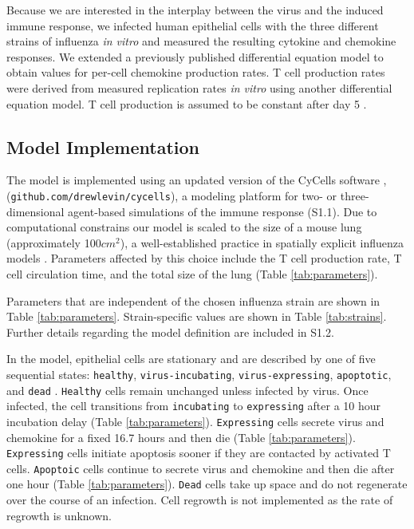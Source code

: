 \documentclass[preprint,10pt,authoryear]{elsarticle}
\begin{document}
Because we are interested in the interplay between the virus and the induced immune response, we infected human epithelial cells with the three different strains of influenza \textit{in vitro} and measured the resulting cytokine and chemokine responses.  We extended a previously published differential equation model \citep{Mitchell2011} to obtain values for per-cell chemokine production rates.  T cell production rates were derived from measured replication rates \textit{in vitro} \citep{Miao2010a} using another differential equation model. T cell production is assumed to be constant after day 5 \citep{MartIn-Fontecha2003}.  

\subsection*{Model Implementation}

The model is implemented using an updated version of the CyCells software \citep{Warrender2006},
(\texttt{github.com/drewlevin/cycells}),
a modeling platform for two- or three-dimensional agent-based simulations of the immune response (S1.1).  Due to computational constrains our model is scaled to the size of a mouse lung (approximately 100$cm^2$), a well-established practice in spatially explicit influenza models \citep{Miller2003, Allan2006, Ingulli2009}.  Parameters affected by this choice include the T cell production rate, T cell circulation time, and the total size of the lung (Table \ref{tab:parameters}).

Parameters that are independent of the chosen influenza strain are shown in Table \ref{tab:parameters}.  Strain-specific values are shown in Table \ref{tab:strains}.  Further details regarding the model definition are included in S1.2.

In the model, epithelial cells are stationary and are described by one of five sequential states: \texttt{healthy}, \texttt{virus-incubating}, \texttt{virus-expressing}, \texttt{apoptotic}, and \texttt{dead} \citep{bachem1996simulated, Beauchemin2005, Mitchell2011}. \texttt{Healthy} cells remain unchanged unless infected by virus. Once infected, the cell transitions from \texttt{incubating} to \texttt{expressing} after a 10 hour incubation delay (Table \ref{tab:parameters}). \texttt{Expressing} cells secrete virus and chemokine for a fixed 16.7 hours and then die (Table \ref{tab:parameters}). \texttt{Expressing} cells initiate apoptosis sooner if they are contacted by activated T cells. \texttt{Apoptoic} cells continue to secrete virus and chemokine and then die after one hour (Table \ref{tab:parameters}). \texttt{Dead} cells take up space and do not regenerate over the course of an infection.  Cell regrowth is not implemented as the rate of regrowth is unknown. 
\end{document}
